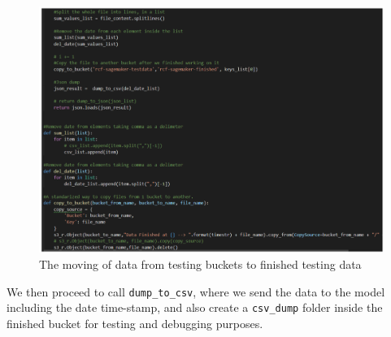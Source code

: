 \begin{figure}[h]
    \centering
    \includegraphics[width=1\textwidth]{images/rcf-data-movement.png}
    \caption{The moving of data from testing buckets to finished testing data}
    \label{fig:rcf_data_movement}
\end{figure}

We then proceed to call \verb|dump_to_csv|, where we send the data to the model including the date time-stamp, and also create a \verb|csv_dump| folder inside the finished bucket for testing and debugging purposes.\\

